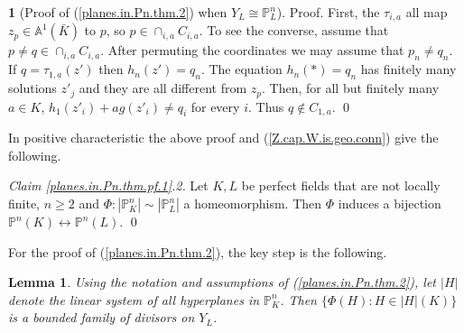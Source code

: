 \documentclass{amsart}
\newtheorem{lem}[thm]{Lemma}
\theoremstyle{definition}
\newtheorem{say}[thm]{}
\theoremstyle{remark}
\renewcommand{\a}[0]{{\mathbb A}}
\newcommand{\p}[0]{{\mathbb P}}
\begin{document}
\begin{say}[Proof of (\ref{planes.in.Pn.thm.2}) when $Y_L\cong \p^n_L$]
Proof. 
First,  the $\tau_{i,a}$ all map $z_p\in \a^1(\bar K)$ to $p$, so $p\in \cap_{i,a} C_{i,a}$.  To see the converse, assume that
$p\neq q\in \cap_{i,a} C_{i,a}$. After permuting the coordinates we may assume that  $p_n\neq q_n$.  If $q=\tau_{1,a}(z')$ then $h_n(z')=q_n$.
The equation  $h_n(*)=q_n$ has  finitely many solutions  $z'_j$ and they are all different from $z_p$. Then, for all but finitely many  $a\in K$, $h_1(z'_i)+ag(z'_i)\neq q_i$  for every $i$. Thus $q\not\in C_{1,a}$. \qed
\medskip

In positive characteristic  the above proof and (\ref{Z.cap.W.is.geo.conn}) give the following.
\medskip

{\it Claim \ref{planes.in.Pn.thm.pf.1}.2.}
 Let $K, L$ be  perfect  fields that are not locally finite,  $n\geq 2$ and 
$\Phi:|\p^n_K|\sim |\p^n_L|$ a  homeo\-morphism. Then $\Phi$ induces a bijection
$\p^n(K)\leftrightarrow \p^n(L)$. \qed
\end{say}



For the proof of (\ref{planes.in.Pn.thm.2}), the key step is the following.

\begin{lem}\label{planes.in.Pn.thm.2.lem}
Using the notation and assumptions of (\ref{planes.in.Pn.thm.2}), 
let $|H|$ denote the linear system of all
hyperplanes in $\p^n_K$. Then 
 $\{\Phi(H): H\in |H|(K)\}$ is a bounded family of divisors on $Y_L$.
\end{lem}
\end{document}
